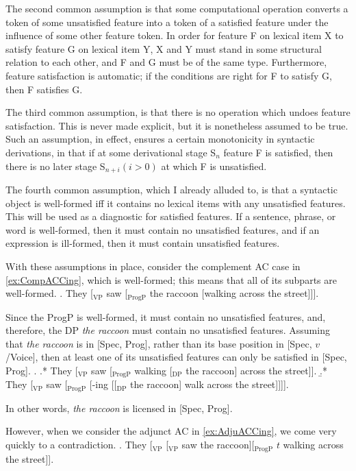 \documentclass[MilwayThesis]{subfiles}
\begin{document}
The second common assumption is that some computational operation converts a token of some unsatisfied feature into a token of a satisfied feature under the influence of some other feature token.
In order for feature F on lexical item X to satisfy feature G on lexical item Y, X and Y must stand in some structural relation to each other, and F and G must be of the same type.
Furthermore, feature satisfaction is automatic; if the conditions are right for F to satisfy G, then F satisfies G.

The third common assumption, is that there is no operation which undoes feature satisfaction.
This is never made explicit, but it is nonetheless assumed to be true.
Such an assumption, in effect, ensures a certain monotonicity in syntactic derivations, in that if at some derivational stage S$_n$ feature F is satisfied, then there is no later stage S$_{n+i} (i > 0)$ at which F is unsatisfied.

The fourth common assumption, which I already alluded to, is that a syntactic object is well-formed iff it contains no lexical items with any unsatisfied features.
This will be used as a diagnostic for satisfied features.
If a sentence, phrase, or word is well-formed, then it must contain no unsatisfied features, and if an expression is ill-formed, then it must contain unsatisfied features.

With these assumptions in place, consider the complement AC case in \cref{ex:CompACCing}, which is well-formed; this means that all of its subparts are well-formed.
\ex. They [$_\text{VP}$ saw [$_\text{ProgP}$ the raccoon [walking across the street]]].\label{ex:CompACCing}

Since the ProgP is well-formed, it must contain no unsatisfied features, and, therefore, the DP \textit{the raccoon} must contain no unsatisfied features.
Assuming that \textit{the raccoon} is in [Spec, Prog], rather than its base position in [Spec, $v$/Voice], then at least one of its unsatisfied features can only be satisfied in [Spec, Prog]. 
\ex.
\a.* They [$_\text{VP}$ saw [$_\text{ProgP}$ walking [$_\text{DP}$ the raccoon] across the street]].
\b.* They [$_\text{VP}$ saw [$_\text{ProgP}$ [-ing [[$_\text{DP}$ the raccoon] walk across the street]]]].

In other words, \textit{the raccoon} is licensed in [Spec, Prog].

However, when we consider the adjunct AC in \cref{ex:AdjuACCing}, we come very quickly to a contradiction.
\ex. They [$_\text{VP}$ [$_\text{VP}$ saw the raccoon][$_\text{ProgP}$ $t$ walking across the street]].\label{ex:AdjuACCing}
\end{document}

